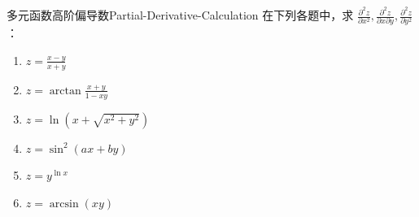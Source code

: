 \begin{problem}{多元函数高阶偏导数}{Partial-Derivative-Calculation}
    在下列各题中，求 $\frac{\partial^{2} z}{\partial x^{2}}, \frac{\partial^{2} z}{\partial x \partial y}, \frac{\partial^{2} z}{\partial y^{2}}$：
    \begin{enumerate}
        \item $z = \frac{x-y}{x+y}$
        \item $z = \arctan \frac{x+y}{1-xy}$
        \item $z = \ln(x + \sqrt{x^{2} + y^{2}})$
        \item $z = \sin^{2}(ax + by)$
        \item $z = y^{\ln x}$
        \item $z = \arcsin(xy)$
    \end{enumerate}
\end{problem}

